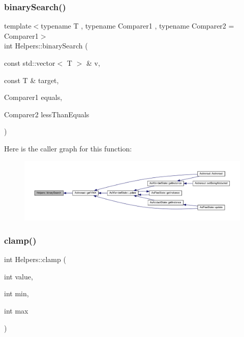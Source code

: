 \subsubsection{\texorpdfstring{binary\+Search()}{binarySearch()}}
{\footnotesize\ttfamily template$<$typename T , typename Comparer1 , typename Comparer2  = Comparer1$>$ \\
int Helpers\+::binary\+Search (\begin{DoxyParamCaption}\item[{const std\+::vector$<$ T $>$ \&}]{v,  }\item[{const T \&}]{target,  }\item[{Comparer1}]{equals,  }\item[{Comparer2}]{less\+Than\+Equals }\end{DoxyParamCaption})\hspace{0.3cm}{\ttfamily [inline]}}

Here is the caller graph for this function\+:
\nopagebreak
\begin{figure}[H]
\begin{center}
\leavevmode
\includegraphics[width=350pt]{namespace_helpers_a17de449489ff14414634beaa710176cd_icgraph}
\end{center}
\end{figure}
\mbox{\label{namespace_helpers_acafe0d99760ee8ee1ffbd365f974cafe}} 
\subsubsection{\texorpdfstring{clamp()}{clamp()}}
{\footnotesize\ttfamily int Helpers\+::clamp (\begin{DoxyParamCaption}\item[{int}]{value,  }\item[{int}]{min,  }\item[{int}]{max }\end{DoxyParamCaption})\hspace{0.3cm}{\ttfamily [inline]}}


